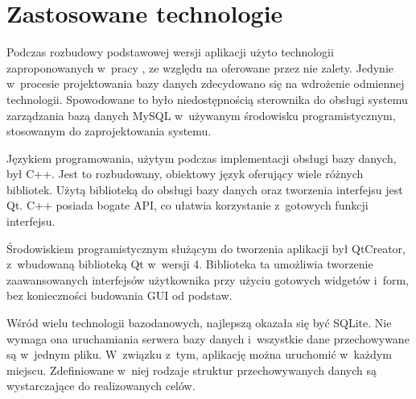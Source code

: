 \section{Zastosowane technologie}
\label{sec:implementacja}

Podczas rozbudowy podstawowej wersji aplikacji użyto technologii zaproponowanych w~pracy \cite{Gl11}, ze względu na oferowane przez nie zalety. Jedynie w~procesie projektowania bazy danych zdecydowano się na wdrożenie odmiennej technologii. Spowodowane to było niedostępnością sterownika do obsługi systemu zarządzania bazą danych MySQL w~używanym środowisku programistycznym, stosowanym do zaprojektowania systemu.

Językiem programowania, użytym podczas implementacji obsługi bazy danych, był C++. Jest to rozbudowany, obiektowy język oferujący wiele różnych bibliotek. Użytą biblioteką do obsługi bazy danych oraz tworzenia interfejsu jest Qt. C++ posiada bogate API, co ułatwia korzystanie z~gotowych funkcji interfejsu.

Środowiskiem programistycznym służącym do tworzenia aplikacji był QtCreator, z~wbudowaną biblioteką Qt w~wersji 4. Biblioteka ta umożliwia tworzenie zaawansowanych interfejsów użytkownika przy użyciu gotowych widgetów i~form, bez konieczności budowania GUI od podstaw.

Wśród wielu technologii bazodanowych, najlepszą okazała się być SQLite. Nie wymaga ona uruchamiania serwera bazy danych i~wszystkie dane przechowywane są w~jednym pliku. W~związku z~tym, aplikację można uruchomić w~każdym miejscu. Zdefiniowane w~niej rodzaje struktur przechowywanych danych są wystarczające do realizowanych celów.

